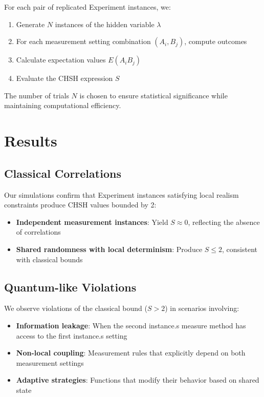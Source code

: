 \documentclass[11pt,a4paper]{article}
\begin{document}
For each pair of replicated Experiment instances, we:

\begin{enumerate}
\item Generate $N$ instances of the hidden variable $\lambda$
\item For each measurement setting combination $(A_i, B_j)$, compute outcomes
\item Calculate expectation values $E(A_iB_j)$
\item Evaluate the CHSH expression $S$
\end{enumerate}

The number of trials $N$ is chosen to ensure statistical significance while maintaining computational efficiency.

\section{Results}

\subsection{Classical Correlations}

Our simulations confirm that Experiment instances satisfying local realism constraints produce CHSH values bounded by 2:

\begin{itemize}
\item \textbf{Independent measurement instances}: Yield $S \approx 0$, reflecting the absence of correlations
\item \textbf{Shared randomness with local determinism}: Produce $S \leq 2$, consistent with classical bounds
\end{itemize}

\subsection{Quantum-like Violations}

We observe violations of the classical bound ($S > 2$) in scenarios involving:

\begin{itemize}
\item \textbf{Information leakage}: When the second instance.s measure method has access to the first instance.s setting
\item \textbf{Non-local coupling}: Measurement rules that explicitly depend on both measurement settings
\item \textbf{Adaptive strategies}: Functions that modify their behavior based on shared state
\end{itemize}
\end{document}

